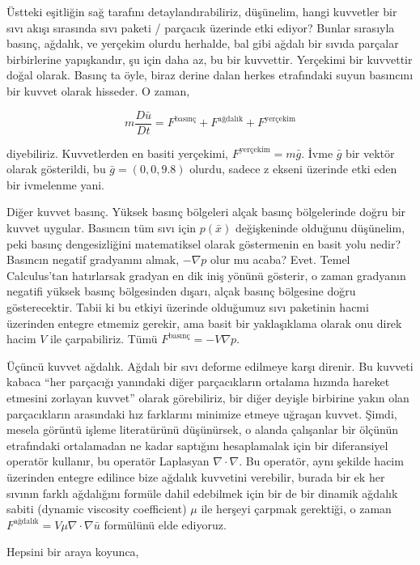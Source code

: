 \documentclass[12pt,fleqn]{article}\usepackage{../../common}
\begin{document}
Üstteki eşitliğin sağ tarafını detaylandırabiliriz, düşünelim, hangi kuvvetler
bir sıvı akışı sırasında sıvı paketi / parçacık üzerinde etki ediyor? Bunlar
sırasıyla basınç, ağdalık, ve yerçekim olurdu herhalde, bal gibi ağdalı bir
sıvıda parçalar birbirlerine yapışkandır, şu için daha az, bu bir
kuvvettir. Yerçekimi bir kuvvettir doğal olarak. Basınç ta öyle, biraz derine
dalan herkes etrafındaki suyun basıncını bir kuvvet olarak hisseder. O zaman,

$$
m \frac{D \bar{u}}{D t} = F^{\textrm{basınç}} + F^{\textrm{ağdalık}} + F^{\textrm{yerçekim}} 
$$

diyebiliriz. Kuvvetlerden en basiti yerçekimi, $F^{\textrm{yerçekim}} = m
\bar{g}$. İvme $\bar{g}$ bir vektör olarak gösterildi, bu $\bar{g} = (0, 0,
9.8)$ olurdu, sadece z ekseni üzerinde etki eden bir ivmelenme yani.

Diğer kuvvet basınç. Yüksek basınç bölgeleri alçak basınç bölgelerinde doğru bir
kuvvet uygular. Basıncın tüm sıvı için $p(\bar{x})$ değişkeninde olduğunu
düşünelim, peki basınç dengesizliğini matematiksel olarak göstermenin en basit
yolu nedir? Basıncın negatif gradyanını almak, $-\nabla p$ olur mu acaba?
Evet. Temel Calculus'tan hatırlarsak gradyan en dik iniş yönünü gösterir, o
zaman gradyanın negatifi yüksek basınç bölgesinden dışarı, alçak basınç
bölgesine doğru gösterecektir. Tabii ki bu etkiyi üzerinde olduğumuz sıvı
paketinin hacmi üzerinden entegre etmemiz gerekir, ama basit bir yaklaşıklama
olarak onu direk hacim $V$ ile çarpabiliriz. Tümü $F^{\textrm{basınç}} = - V
\nabla p$.

Üçüncü kuvvet ağdalık. Ağdalı bir sıvı deforme edilmeye karşı direnir. Bu
kuvveti kabaca ``her parçacığı yanındaki diğer parçacıkların ortalama hızında
hareket etmesini zorlayan kuvvet'' olarak görebiliriz, bir diğer deyişle
birbirine yakın olan parçacıkların arasındaki hız farklarını minimize etmeye
uğraşan kuvvet. Şimdi, mesela görüntü işleme literatürünü düşünürsek, o alanda
çalışanlar bir ölçünün etrafındaki ortalamadan ne kadar saptığını hesaplamalak
için bir diferansiyel operatör kullanır, bu operatör Laplasyan $\nabla \cdot
\nabla$.  Bu operatör, aynı şekilde hacim üzerinden entegre edilince bize
ağdalık kuvvetini verebilir, burada bir ek her sıvının farklı ağdalığını formüle
dahil edebilmek için bir de bir dinamik ağdalık sabiti (dynamic viscosity
coefficient) $\mu$ ile herşeyi çarpmak gerektiği, o zaman $F^{\textrm{ağdalık}}
= V \mu \nabla \cdot \nabla \bar{u}$ formülünü elde ediyoruz.

Hepsini bir araya koyunca,
\end{document}
